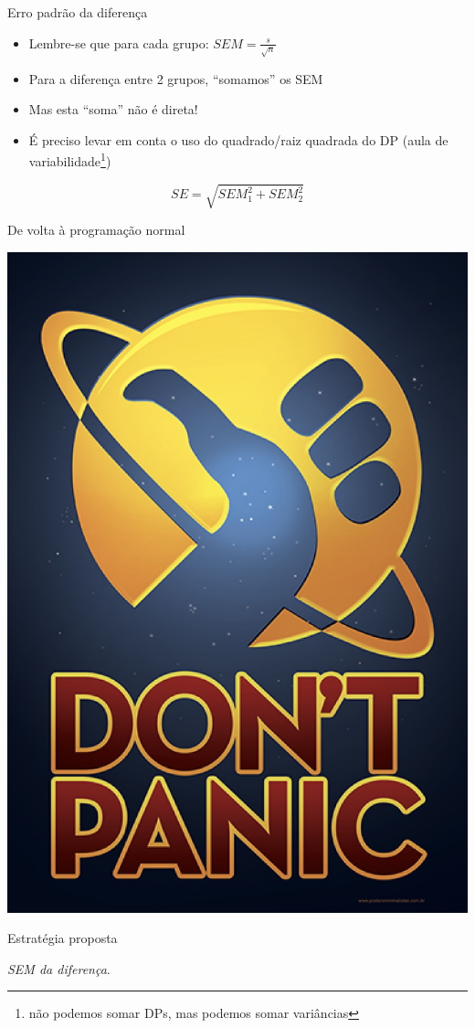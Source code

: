 \documentclass{beamer}
\begin{document}
\begin{frame}{Erro padrão da diferença}
  \begin{itemize}
  \item Lembre-se que para cada grupo: $SEM = \frac{s}{\sqrt{n}}$
  \item Para a diferença entre 2 grupos, ``somamos'' os SEM
  \item Mas esta ``soma'' não é direta!
  \item É preciso levar em conta o uso do quadrado/raiz quadrada do DP (aula de variabilidade\footnote{não podemos somar DPs, mas podemos somar variâncias})
  \end{itemize}
  \begin{block}{}
      \begin{displaymath}
    SE = \sqrt{SEM_1^2 + SEM_2^2}
  \end{displaymath}
  \end{block}
\end{frame}

\begin{frame}{De volta à programação normal}
  \begin{center}
    \includegraphics[height=.7\textheight]{Cap7/naoentreempanico}
  \end{center}
    \begin{block}{Estratégia proposta}
      \begin{center}
        {\em SEM da diferença}.
      \end{center}
  \end{block}
\end{frame}
\end{document}
